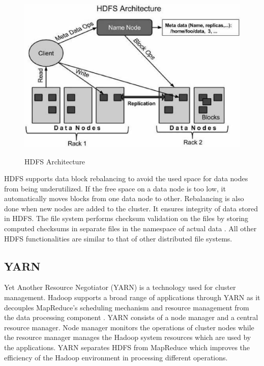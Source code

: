 \documentclass[9pt,twocolumn,twoside]{../../styles/osajnl}
\begin{document}
\begin{figure}[ht]
  \includegraphics[scale=0.45]{images/hdfs_architecture.eps}
  \caption{HDFS Architecture} \cite{hdfsArch}
\end{figure}

HDFS supports data block rebalancing to avoid the used space for data
nodes from being underutilized. If the free space on a data node is
too low, it automatically moves blocks from one data node to
other. Rebalancing is also done when new nodes are added to the
cluster. It ensures integrity of data stored in HDFS. The file system
performs checksum validation on the files by storing computed
checksums in separate files in the namespace of actual data
\cite{hdfsIbm}. All other HDFS functionalities are similar to that of
other distributed file systems.



\subsection{YARN}

Yet Another Resource Negotiator (YARN) is a technology used for
cluster management. Hadoop supports a broad range of applications
through YARN as it decouples MapReduce’s scheduling mechanism and
resource management from the data processing component
\cite{yarnDef}. YARN consists of a node manager and a central resource
manager. Node manager monitors the operations of cluster nodes while
the resource manager manages the Hadoop system resources which are
used by the applications. YARN separates HDFS from MapReduce which
improves the efficiency of the Hadoop environment in processing
different operations.
\end{document}
